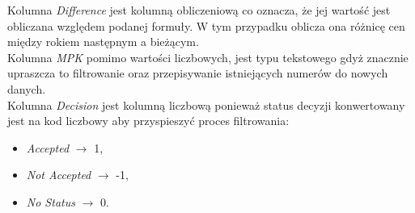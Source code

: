     \noindent Kolumna \emph{Difference} jest kolumną obliczeniową co oznacza, że jej wartość jest obliczana względem podanej formuły. W tym przypadku oblicza ona różnicę cen między rokiem następnym a bieżącym. \\
    Kolumna \emph{MPK} pomimo wartości liczbowych, jest typu tekstowego gdyż znacznie upraszcza to filtrowanie oraz przepisywanie istniejących numerów do nowych danych. \\
    Kolumna \emph{Decision} jest kolumną liczbową ponieważ status decyzji konwertowany jest na kod liczbowy aby przyspieszyć proces filtrowania:
    \begin{itemize}
        \item \emph{Accepted} $\rightarrow$ 1,
        \item \emph{Not Accepted} $\rightarrow$ -1,
        \item \emph{No Status} $\rightarrow$ 0.
    \end{itemize}

    

